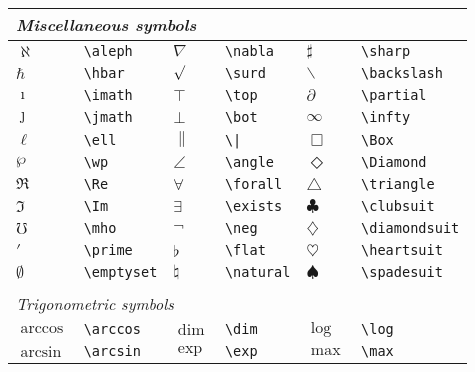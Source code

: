 \begin{tabular}{llllll} 
\\
\multicolumn{6}{l}{\em Miscellaneous symbols} \\ \hline
$\aleph$             & \verb+\aleph+             & $\nabla$                & \verb+\nabla+              & $\sharp$       & \verb+\sharp+ \\
$\hbar$              & \verb+\hbar+              & $\surd$                 & \verb+\surd+               & $\backslash$   & \verb+\backslash+ \\
$\imath$             & \verb+\imath+             & $\top$                  & \verb+\top+                & $\partial$     & \verb+\partial+ \\
$\jmath$             & \verb+\jmath+             & $\bot$                  & \verb+\bot+                & $\infty$       & \verb+\infty+ \\
$\ell$               & \verb+\ell+               & $\|$                    & \verb+\|+                  & $\Box$         & \verb+\Box+ \\
$\wp$                & \verb+\wp+                & $\angle$                & \verb+\angle+              & $\Diamond$     & \verb+\Diamond+ \\
$\Re$                & \verb+\Re+                & $\forall$               & \verb+\forall+             & $\triangle$    & \verb+\triangle+ \\
$\Im$                & \verb+\Im+                & $\exists$               & \verb+\exists+             & $\clubsuit$    & \verb+\clubsuit+ \\
$\mho$               & \verb+\mho+               & $\neg$                  & \verb+\neg+                & $\diamondsuit$ & \verb+\diamondsuit+ \\
$\prime$             & \verb+\prime+             & $\flat$                 & \verb+\flat+               & $\heartsuit$   & \verb+\heartsuit+ \\
$\emptyset$          & \verb+\emptyset+          & $\natural$              & \verb+\natural+            & $\spadesuit$   & \verb+\spadesuit+ \\
\\
\multicolumn{6}{l}{\em Trigonometric symbols} \\ \hline
$\arccos$            & \verb+\arccos+            & $\dim$                  & \verb+\dim+                & $\log$         & \verb+\log+ \\
$\arcsin$            & \verb+\arcsin+            & $\exp$                  & \verb+\exp+                & $\max$         & \verb+\max+ \\

\end{tabular}
